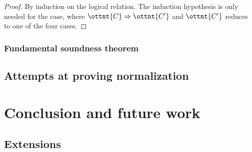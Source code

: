 \documentclass[a4paper,UKenglish,cleveref,autoref,thm-restate]{lipics-v2021}
\newcommand{\citet}[1]{\cite{#1}}
\begin{document}
\begin{proof}
  By induction on the logical relation.
  The induction hypothesis is only needed for the  case,
  where $ \ottnt{C}  \Rightarrow  \ottnt{C'} $ and $\ottnt{C'}$ reduces to one of the four cases.
\end{proof}

\subsubsection{Fundamental soundness theorem}

\subsection{Attempts at proving normalization}

\section{Conclusion and future work}

\subsection{Extensions}

\citet{gen-univ,univ-poly}



\end{document}
